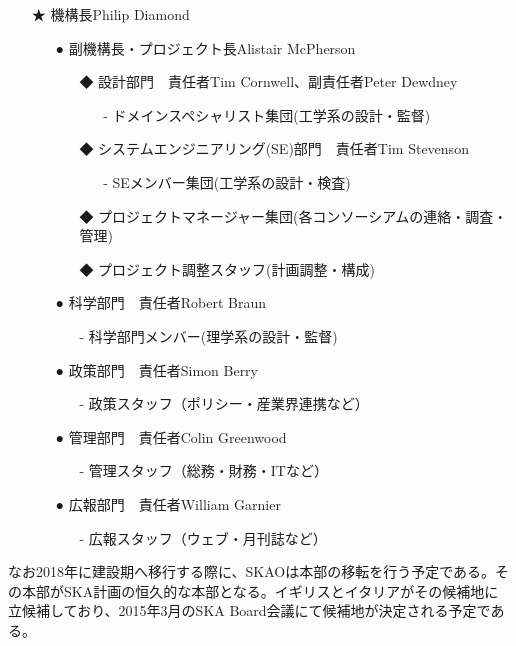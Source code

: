 \begin{itemize}
\item[★] 機構長Philip Diamond

\begin{itemize}

\item[●] 副機構長・プロジェクト長Alistair McPherson
\begin{itemize}
\item[◆] 設計部門　責任者Tim Cornwell、副責任者Peter Dewdney
\begin{itemize}
\item[-] ドメインスペシャリスト集団(工学系の設計・監督)
\end{itemize}
\item[◆] システムエンジニアリング(SE)部門　責任者Tim Stevenson
\begin{itemize}
\item[-] SEメンバー集団(工学系の設計・検査)
\end{itemize}
\item[◆] プロジェクトマネージャー集団(各コンソーシアムの連絡・調査・管理)
\item[◆] プロジェクト調整スタッフ(計画調整・構成)
\end{itemize}

\item[●] 科学部門　責任者Robert Braun
\begin{itemize}
\item[-] 科学部門メンバー(理学系の設計・監督)
\end{itemize}

\item[●] 政策部門　責任者Simon Berry
\begin{itemize}
\item[-] 政策スタッフ（ポリシー・産業界連携など）
\end{itemize}

\item[●] 管理部門　責任者Colin Greenwood
\begin{itemize}
\item[-] 管理スタッフ（総務・財務・ITなど）
\end{itemize}

\item[●] 広報部門　責任者William Garnier
\begin{itemize}
\item[-] 広報スタッフ（ウェブ・月刊誌など）
\end{itemize}

\end{itemize}
\end{itemize}
なお2018年に建設期へ移行する際に、SKAOは本部の移転を行う予定である。その本部がSKA計画の恒久的な本部となる。イギリスとイタリアがその候補地に立候補しており、2015年3月のSKA Board会議にて候補地が決定される予定である。

